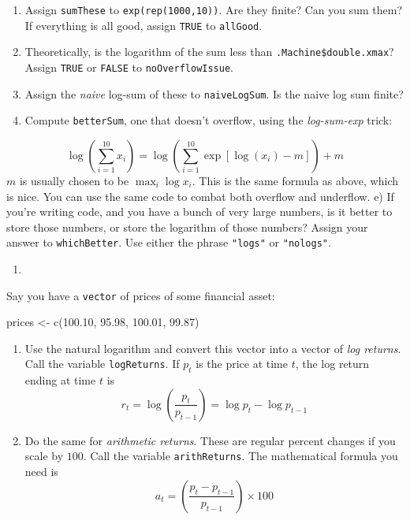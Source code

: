 \documentclass[
  12pt,
  krantz2]{krantz}
\makeatletter
\newenvironment{Shaded}{\begin{snugshade}}{\end{snugshade}}
\newcommand{\FloatTok}[1]{\textcolor[rgb]{0.06,0.06,0.06}{#1}}
\newcommand{\FunctionTok}[1]{\textcolor[rgb]{0,0,0}{#1}}
\newcommand{\NormalTok}[1]{#1}
\newcommand{\OtherTok}[1]{\textcolor[rgb]{0.37,0.37,0.37}{#1}}
\providecommand{\tightlist}{%
  \setlength{\itemsep}{0pt}\setlength{\parskip}{0pt}}
\newenvironment{kframe}{%
\medskip{}
\setlength{\fboxsep}{.8em}
 \def\at@end@of@kframe{}%
 \ifinner\ifhmode%
  \def\at@end@of@kframe{\end{minipage}}%
  \begin{minipage}{\columnwidth}%
 \fi\fi%
 \def\FrameCommand##1{\hskip\@totalleftmargin \hskip-\fboxsep
 \colorbox{shadecolor}{##1}\hskip-\fboxsep
     \hskip-\linewidth \hskip-\@totalleftmargin \hskip\columnwidth}%
 \MakeFramed {\advance\hsize-\width
   \@totalleftmargin\z@ \linewidth\hsize
   \@setminipage}}%
 {\par\unskip\endMakeFramed%
 \at@end@of@kframe}
\renewenvironment{Shaded}{\begin{kframe}}{\end{kframe}}
\makeatother
\begin{document}
\begin{enumerate}
\def\labelenumi{\alph{enumi})}
\tightlist
\item
  Assign \texttt{sumThese} to \texttt{exp(rep(1000,10))}. Are they finite? Can you sum them? If everything is all good, assign \texttt{TRUE} to \texttt{allGood}.
\item
  Theoretically, is the logarithm of the sum less than \texttt{.Machine\$double.xmax}? Assign \texttt{TRUE} or \texttt{FALSE} to \texttt{noOverflowIssue}.
\item
  Assign the \emph{naive} log-sum of these to \texttt{naiveLogSum}. Is the naive log sum finite?
\item
  Compute \texttt{betterSum}, one that doesn't overflow, using the \emph{log-sum-exp} trick:
\end{enumerate}

\[
  \log\left( \sum_{i=1}^{10} x_i \right) = \log\left( \sum_{i=1}^{10} \exp[ \log(x_i) - m] \right) + m  
  \]
\(m\) is usually chosen to be \(\max_i \log x_i\). This is the same formula as above, which is nice. You can use the same code to combat both overflow and underflow.
e) If you're writing code, and you have a bunch of very large numbers, is it better to store those numbers, or store the logarithm of those numbers? Assign your answer to \texttt{whichBetter}. Use either the phrase \texttt{"logs"} or \texttt{"nologs"}.

\begin{enumerate}
\def\labelenumi{\arabic{enumi}.}
\setcounter{enumi}{4}
\tightlist
\item
\end{enumerate}

Say you have a \texttt{vector} of prices of some financial asset:

\begin{Shaded}
\begin{Highlighting}[]
\NormalTok{prices }\OtherTok{\textless{}{-}} \FunctionTok{c}\NormalTok{(}\FloatTok{100.10}\NormalTok{, }\FloatTok{95.98}\NormalTok{, }\FloatTok{100.01}\NormalTok{, }\FloatTok{99.87}\NormalTok{)}
\end{Highlighting}
\end{Shaded}

\begin{enumerate}
\def\labelenumi{\alph{enumi})}
\item
  Use the natural logarithm and convert this vector into a vector of \emph{log returns}. Call the variable \texttt{logReturns}. If \(p_t\) is the price at time \(t\), the log return ending at time \(t\) is
  \begin{equation} 
  r_t = \log \left( \frac{p_t}{p_{t-1}} \right) = \log p_t - \log p_{t-1}
  \end{equation}
\item
  Do the same for \emph{arithmetic returns}. These are regular percent changes if you scale by \(100\). Call the variable \texttt{arithReturns}. The mathematical formula you need is
  \begin{equation} 
  a_t = \left( \frac{p_t - p_{t-1} }{p_{t-1}} \right) \times 100 
  \end{equation}
\end{enumerate}
\end{document}
